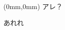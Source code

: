 \documentclass[a5paper,tombow]{jsarticle}
\begin{document}
\begin{textblock*}{20em}(0mm,0mm)%
  \noindent アレ？
\end{textblock*}

あれれ
\end{document}
